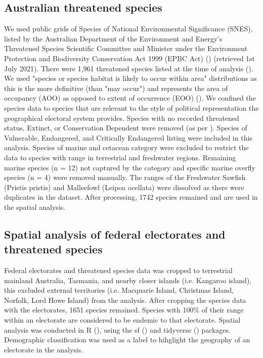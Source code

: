 \documentclass[a4paper,11pt]{article}
\begin{document}
\subsection{Australian threatened species}

We used public grids of Species of National Environmental Significance (SNES), listed by the Australian Department of the Environment and Energy’s Threatened Species Scientific Committee and Minister under the Environment Protection and Biodiversity Conservation Act 1999 (EPBC Act) (\cite{commonwealthofaustraliaThreatenedSpeciesEPBC2021}) (retrieved 1st July 2021). There were 1,961 threatened species listed at the time of analysis (\cite{commonwealthofaustraliaThreatenedSpeciesEPBC2021}). We used "species or species habitat is likely to occur within area" distributions as this is the more definitive (than "may occur") and represents the area of occupancy (AOO) as opposed to extent of occurrence (EOO) (\cite{gastonSizesSpeciesGeographic2009, lloydEstimatingSpatialCoverage2020}). We confined the species data to species that are relevant to the style of political representation the geographical electoral system provides. Species with no recorded threatened status, Extinct, or Conservation Dependent were removed (as per \cite{wardNationalscaleDatasetThreats}). Species of Vulnerable, Endangered, and Critically Endangered listing were included in this analysis. Species of marine and cetacean category were excluded to restrict the data to species with range in terrestrial and freshwater regions. Remaining marine species (n = 12) not captured by the category and specific marine overfly species (n = 4) were removed manually. The ranges of the Freshwater Sawfish (Pristis pristis) and Malleefowl (Leipoa ocellata) were dissolved as there were duplicates in the dataset. After processing, 1742 species remained and are used in the spatial analysis.

\subsection{Spatial analysis of federal electorates and threatened species}

Federal electorates and threatened species data was cropped to terrestrial mainland Australia, Tasmania, and nearby closer islands (i.e. Kangaroo island), this excluded external territories (i.e. Macquarie Island, Christmas Island, Norfolk, Lord Howe Island) from the analysis. After cropping the species data with the electorates, 1651 species remained. Species with 100\% of their range within an electorate are considered to be endemic to that electorate. Spatial analysis was conducted in R (\cite{rcoreteamLanguageEnvironmentStatistical2021}), using the sf (\cite{pebesmaSimpleFeaturesStandardized2018}) and tidyverse (\cite{wickhamWelcomeTidyverse2019}) packages.
Demographic classification was used as a label to hihglight the geography of an electorate in the analysis.
\end{document}

